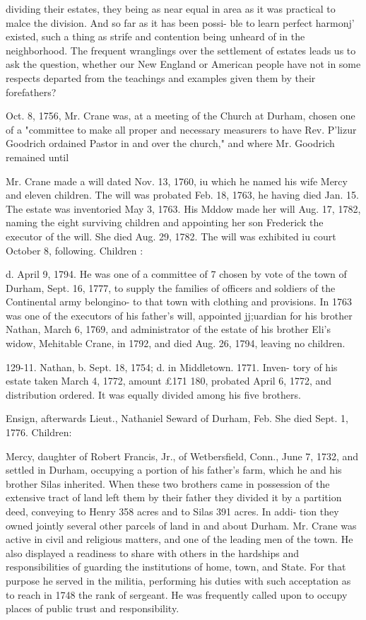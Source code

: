 \documentclass{book}
\begin{document}
dividing their estates, they being as near equal in area as it was 
practical to malce the division. And so far as it has been possi- 
ble to learn perfect harmonj' existed, such a thing as strife and 
contention being unheard of in the neighborhood. The frequent 
wranglings over the settlement of estates leads us to ask the 
question, whether our New England or American people have not 
in some respects departed from the teachings and examples given 
them by their forefathers? 

Oct. 8, 1756, Mr. Crane was, at a meeting of the Church at 
Durham, chosen one of a "committee to make all proper and 
necessary measurers to have Rev. P'lizur Goodrich ordained Pastor 
in and over the church," and where Mr. Goodrich remained until 

Mr. Crane made a will dated Nov. 13, 1760, iu which he named 
his wife Mercy and eleven children. The will was probated Feb. 
18, 1763, he having died Jan. 15. The estate was inventoried 
May 3, 1763. His Mddow made her will Aug. 17, 1782, naming 
the eight surviving children and appointing her son Frederick the 
executor of the will. She died Aug. 29, 1782. The will was 
exhibited iu court October 8, following. 
Children : 



d. April 9, 1794. He was one of a committee of 7 chosen 
by vote of the town of Durham, Sept. 16, 1777, to supply 
the families of officers and soldiers of the Continental 
army belongino- to that town with clothing and provisions. 
In 1763 was one of the executors of his father's will, 
appointed jj;uardian for his brother Nathan, March 6, 1769, 
and administrator of the estate of his brother Eli's widow, 
Mehitable Crane, in 1792, and died Aug. 26, 1794, leaving 
no children. 

129-11. Nathan, b. Sept. 18, 1754; d. in Middletown. 1771. Inven- 
tory of his estate taken March 4, 1772, amount £171  180, 
probated April 6, 1772, and distribution ordered. It was 
equally divided among his five brothers. 

Ensign, afterwards Lieut., Nathaniel Seward of Durham, Feb. 
She died Sept. 1, 1776. Children: 








Mercy, daughter of Robert Francis, Jr., of Wetbersfield, Conn., 
June 7, 1732, and settled in Durham, occupying a portion of his 
father's farm, which he and his brother Silas inherited. When 
these two brothers came in possession of the extensive tract of 
land left them by their father they divided it by a partition deed, 
conveying to Henry 358 acres and to Silas 391 acres. In addi- 
tion they owned jointly several other parcels of land in and about 
Durham. Mr. Crane was active in civil and religious matters, 
and one of the leading men of the town. He also displayed a 
readiness to share with others in the hardships and responsibilities 
of guarding the institutions of home, town, and State. For that 
purpose he served in the militia, performing his duties with such 
acceptation as to reach in 1748 the rank of sergeant. He was 
frequently called upon to occupy places of public trust and 
responsibility. 
\end{document}

